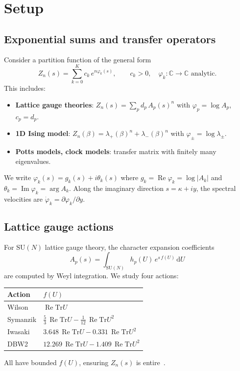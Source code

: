 \documentclass[12pt]{article}
\theoremstyle{definition}
\theoremstyle{remark}
\newcommand{\SU}{\mathrm{SU}}
\newcommand{\Tr}{\mathrm{Tr}}
\newcommand{\dU}{\,\mathrm{d}U}
\newcommand{\re}{\operatorname{Re}}
\newcommand{\im}{\operatorname{Im}}
\begin{document}
\section{Setup}
\label{sec:setup}

\subsection{Exponential sums and transfer operators}

Consider a partition function of the general form
\begin{equation}\label{eq:exp_sum}
Z_n(s) = \sum_{k=0}^{K} c_k\, e^{n\varphi_k(s)},
\qquad c_k > 0,\quad \varphi_k : \mathbb{C} \to \mathbb{C}
  \text{ analytic}.
\end{equation}
This includes:
\begin{itemize}
\item \textbf{Lattice gauge theories}: $Z_n(s) = \sum_p d_p\,A_p(s)^n$
  with $\varphi_p = \log A_p$, $c_p = d_p$.
\item \textbf{1D Ising model}: $Z_n(\beta) = \lambda_+(\beta)^n +
  \lambda_-(\beta)^n$ with $\varphi_\pm = \log\lambda_\pm$.
\item \textbf{Potts models, clock models}: transfer matrix with finitely
  many eigenvalues.
\end{itemize}

We write $\varphi_k(s) = g_k(s) + i\theta_k(s)$ where
$g_k = \re\varphi_k = \log|A_k|$ and $\theta_k = \im\varphi_k = \arg A_k$.
Along the imaginary direction $s = \kappa + iy$, the spectral velocities
are $\dot\varphi_k = \partial\varphi_k/\partial y$.

\subsection{Lattice gauge actions}

For $\SU(N)$ lattice gauge theory, the character expansion coefficients
\begin{equation}
A_p(s) = \int_{\SU(N)} h_p(U)\, e^{s\,f(U)}\dU
\end{equation}
are computed by Weyl integration.  We study four actions:
\begin{center}
\begin{tabular}{ll}
\toprule
Action & $f(U)$ \\
\midrule
Wilson & $\re\Tr U$ \\
Symanzik & $\tfrac{5}{3}\,\re\Tr U - \tfrac{1}{12}\,\re\Tr U^2$ \\
Iwasaki & $3.648\,\re\Tr U - 0.331\,\re\Tr U^2$ \\
DBW2 & $12.269\,\re\Tr U - 1.409\,\re\Tr U^2$ \\
\bottomrule
\end{tabular}
\end{center}
All have bounded $f(U)$, ensuring $Z_n(s)$ is entire~\cite{OlbrykChi}.
\end{document}

